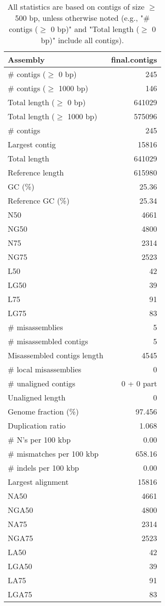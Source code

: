 \documentclass[12pt,a4paper]{article}
\begin{document}
\begin{table}[ht]
\begin{center}
\caption{All statistics are based on contigs of size $\geq$ 500 bp, unless otherwise noted (e.g., "\# contigs ($\geq$ 0 bp)" and "Total length ($\geq$ 0 bp)" include all contigs).}
\begin{tabular}{|l*{1}{|r}|}
\hline
Assembly & final.contigs \\ \hline
\# contigs ($\geq$ 0 bp) & 245 \\ \hline
\# contigs ($\geq$ 1000 bp) & 146 \\ \hline
Total length ($\geq$ 0 bp) & 641029 \\ \hline
Total length ($\geq$ 1000 bp) & 575096 \\ \hline
\# contigs & 245 \\ \hline
Largest contig & 15816 \\ \hline
Total length & 641029 \\ \hline
Reference length & 615980 \\ \hline
GC (\%) & 25.36 \\ \hline
Reference GC (\%) & 25.34 \\ \hline
N50 & 4661 \\ \hline
NG50 & 4800 \\ \hline
N75 & 2314 \\ \hline
NG75 & 2523 \\ \hline
L50 & 42 \\ \hline
LG50 & 39 \\ \hline
L75 & 91 \\ \hline
LG75 & 83 \\ \hline
\# misassemblies & 5 \\ \hline
\# misassembled contigs & 5 \\ \hline
Misassembled contigs length & 4545 \\ \hline
\# local misassemblies & 0 \\ \hline
\# unaligned contigs & 0 + 0 part \\ \hline
Unaligned length & 0 \\ \hline
Genome fraction (\%) & 97.456 \\ \hline
Duplication ratio & 1.068 \\ \hline
\# N's per 100 kbp & 0.00 \\ \hline
\# mismatches per 100 kbp & 658.16 \\ \hline
\# indels per 100 kbp & 0.00 \\ \hline
Largest alignment & 15816 \\ \hline
NA50 & 4661 \\ \hline
NGA50 & 4800 \\ \hline
NA75 & 2314 \\ \hline
NGA75 & 2523 \\ \hline
LA50 & 42 \\ \hline
LGA50 & 39 \\ \hline
LA75 & 91 \\ \hline
LGA75 & 83 \\ \hline
\end{tabular}
\end{center}
\end{table}
\end{document}
